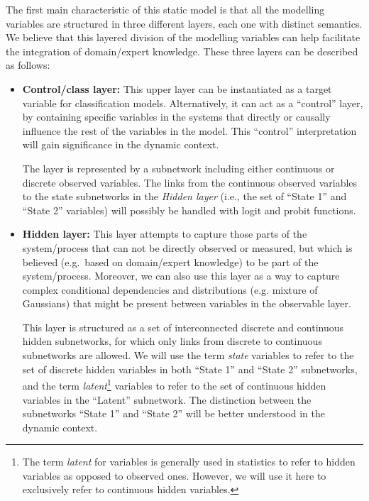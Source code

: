 The first main characteristic of this static model is that all the modelling variables are structured in three different
layers, each one with distinct semantics. We believe that this layered division of the modelling variables can
help facilitate the integration of domain/expert knowledge. These three layers can be described as follows:


\begin{itemize}

\item \textbf{Control/class layer:}  This upper layer can be instantiated as a target variable for classification
  models. Alternatively, it can  act as a ``control'' layer, by containing specific variables in the systems that
  directly or causally influence the rest of the variables in the model. This ``control'' interpretation will gain significance in the dynamic context.

The layer is represented by a subnetwork including either continuous or discrete observed variables. The links from the
continuous observed variables to the state subnetworks in the \textit{Hidden layer} (i.e., the set of ``State 1'' and
``State 2'' variables) will possibly be handled with logit and probit functions.

\item \textbf{Hidden layer:}  This layer attempts to capture those parts of the system/process that can not be directly
  observed or measured, but which is believed (e.g.\ based on domain/expert knowledge) to be part of the system/process. Moreover, we can also use this layer as a way to capture complex conditional dependencies and distributions (e.g. mixture of Gaussians) that might be present between variables in the observable layer. 

This layer is structured as a set of interconnected discrete and continuous hidden subnetworks, for which only links from discrete to continuous subnetworks are allowed. We will use the term \textit{state} variables to refer to the set of discrete hidden variables in both ``State 1'' and ``State 2'' subnetworks, and the term \textit{latent}\footnote{The term \textit{latent} for variables is generally used in statistics to refer to hidden variables as opposed to observed ones. However, we will use it here to exclusively refer to continuous hidden variables.} variables to refer to the set of continuous hidden variables in the ``Latent'' subnetwork. The distinction between the subnetworks ``State 1'' and ``State 2'' will be better understood in the dynamic context. 


\end{itemize}
